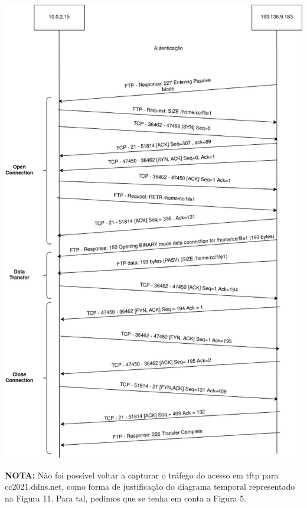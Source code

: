 \documentclass[a4paper]{article}
\begin{document}
\begin{center}
	\includegraphics[scale=0.5]{images/diagramaFTP}
\end{center}

\newpage
\textbf{NOTA:} Não foi possível voltar a capturar o tráfego do acesso em tftp para cc2021.ddns.net, como forma de justificação do diagrama temporal representado na Figura 11. Para tal, pedimos que se tenha em conta a Figura 5.

\vspace{8ex}
\end{document}
